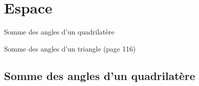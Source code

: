 \documentclass[a4paper,11pt]{report}
\begin{document}
\newcommand{\chapterName}{Espace}
\newcommand{\serieName}{Somme des angles d'un quadrilatère}


\chapter*{\chapterName}
\thispagestyle{empty}

\begin{amL}{\serieName}{
\item Somme des angles d'un triangle (page 116)
}
\end{amL}
\section*{\serieName}
\setcounter{page}{1}
\thispagestyle{firstPage}



\end{document}
